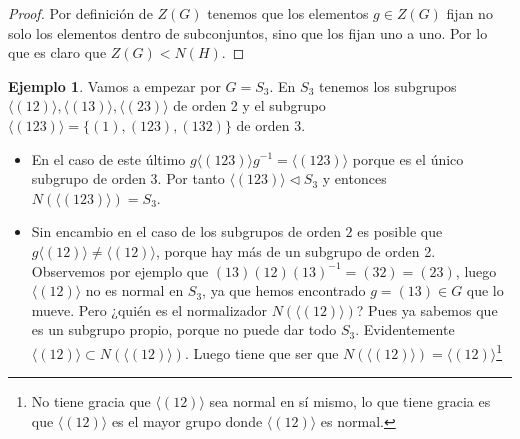 \documentclass{book}
\theoremstyle{definition}
\newtheorem{ej}{Ejemplo}
\theoremstyle{remark}
\newcommand{\normsub}{\mathbin{\triangleleft}}
\newcommand{\inv}[1]{#1^{-1}}
\begin{document}
\begin{proof}
	Por definición de $Z(G)$ tenemos que los elementos $g \in Z(G)$ fijan no solo los elementos dentro de subconjuntos, sino que los fijan uno a uno. Por lo que es claro que $Z(G) < N(H)$. 
\end{proof}

\begin{ej}
	Vamos a empezar por $G = S_3$. En $S_3$ tenemos los subgrupos $\langle (12) \rangle, \langle (13) \rangle, \langle (23) \rangle$ de orden 2 y el subgrupo $\langle (123) \rangle = \{(1), (123), (132)\}$ de orden 3. %
	\begin{itemize}
		\item En el caso de este último $g\langle (123) \rangle \inv{g} = \langle (123) \rangle$ porque es el único subgrupo de orden 3. Por tanto $\langle (123) \rangle \normsub S_3$ y entonces $N(\langle (123) \rangle) = S_3$.
		\item Sin encambio en el caso de los subgrupos de orden $2$ es posible que $g\langle (12) \rangle \neq \langle (12) \rangle$, porque hay más de un subgrupo de orden 2. Observemos por ejemplo que $(13)(12)\inv{(13)} = (32) = (23)$, luego $\langle (12) \rangle$ no es normal en $S_3$, ya que hemos encontrado $g = (13) \in G$ que lo mueve. Pero ¿quién es el normalizador $N(\langle (12) \rangle)$? Pues ya sabemos que es un subgrupo propio, porque no puede dar todo $S_3$. Evidentemente $\langle (12) \rangle \subset N(\langle (12) \rangle)$. Luego tiene que ser que $N(\langle (12) \rangle) = \langle (12) \rangle$\footnote{No tiene gracia que $\langle (12) \rangle$ sea normal en sí mismo, lo que tiene gracia es que $\langle (12) \rangle$ es el mayor grupo donde $\langle (12) \rangle$ es normal.} 
	\end{itemize}
\end{ej}

\end{document}

